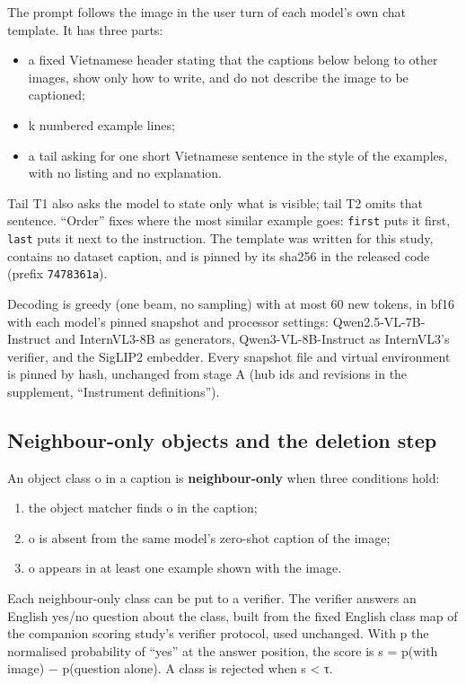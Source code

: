The prompt follows the image in the user turn of each model's own chat template. It has three parts:

\begin{itemize}
\tightlist
\item
  a fixed Vietnamese header stating that the captions below belong to other images, show only how to
  write, and do not describe the image to be captioned;
\item
  k numbered example lines;
\item
  a tail asking for one short Vietnamese sentence in the style of the examples, with no listing and
  no explanation.
\end{itemize}

Tail T1 also asks the model to state only what is visible; tail T2 omits that sentence. ``Order''
fixes where the most similar example goes: \texttt{first} puts it first, \texttt{last} puts it next
to the instruction. The template was written for this study, contains no dataset caption, and is
pinned by its sha256 in the released code (prefix \texttt{7478361a}).

Decoding is greedy (one beam, no sampling) with at most 60 new tokens, in bf16 with each model's
pinned snapshot and processor settings: Qwen2.5-VL-7B-Instruct and InternVL3-8B as generators,
Qwen3-VL-8B-Instruct as InternVL3's verifier, and the SigLIP2 embedder. Every snapshot file and
virtual environment is pinned by hash, unchanged from stage A (hub ids and revisions in the
supplement, ``Instrument definitions'').

\subsection{Neighbour-only objects and the deletion
step}\label{neighbour-only-objects-and-the-deletion-step}

An object class o in a caption is \textbf{neighbour-only} when three conditions hold:

\begin{enumerate}
\def\labelenumi{\arabic{enumi}.}
\tightlist
\item
  the object matcher finds o in the caption;
\item
  o is absent from the same model's zero-shot caption of the image;
\item
  o appears in at least one example shown with the image.
\end{enumerate}

Each neighbour-only class can be put to a verifier. The verifier answers an English yes/no question
about the class, built from the fixed English class map of the companion scoring study's verifier
protocol, used unchanged. With p the normalised probability of ``yes'' at the answer position, the
score is s = p(with image) − p(question alone). A class is rejected when s \textless{} τ.

